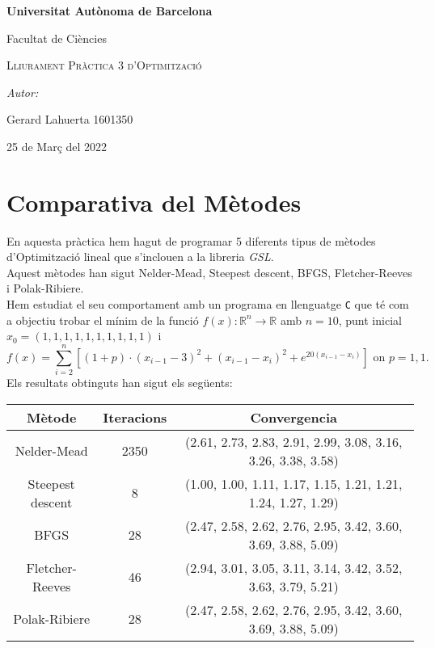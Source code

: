 \documentclass[a4paper, 11pt]{article}
\begin{document}
\begin{titlepage}
    \centering
    {\bfseries\LARGE Universitat Autònoma de Barcelona \par Facultat de Ciències\par}
    \vspace{2cm}
    \vspace{1cm}
    {\scshape\Huge Lliurament Pràctica 3 d'Optimització \par} 
    \vspace{1cm}
    {\Large \itshape Autor: \par}
    {\large Gerard Lahuerta 1601350\par}
    \vspace{1cm}
    {\Large 25 de Març del 2022\par}
\end{titlepage}

\justifying
\newpage
\section{Comparativa del Mètodes}
En aquesta pràctica hem hagut de programar 5 diferents tipus de mètodes d'Optimització lineal que s'inclouen a la libreria \textit{GSL}. \\
Aquest mètodes han sigut Nelder-Mead, Steepest descent, BFGS, Fletcher-Reeves i Polak-Ribiere.\\
Hem estudiat el seu comportament amb un programa en llenguatge \texttt{C} que té com a objectiu trobar el mínim de la funció $f(x): \mathbb{R}^n \longrightarrow \mathbb{R}$ amb $n=10$, punt inicial $x_0=(1,1,1,1,1,1,1,1,1,1)$ i
\begin{equation*}
    f(x) = \sum_{i=2}^{n}\left[(1+p)\cdot (x_{i-1}-3)^2 + (x_{i-1}-x_i)^2 + e^{20(x_{i-1}-x_i)}\right] \text{  on $p=1,1$.}
\end{equation*}
Els resultats obtinguts han sigut els següents:
\begin{center}
  \begin{tabular}{ c | c | c }
    \textbf{Mètode} & \textbf{Iteracions} & \textbf{Convergencia} \\ \hline
     Nelder-Mead & 2350 & (2.61, 2.73, 2.83, 2.91, 2.99, 3.08, 3.16, 3.26, 3.38, 3.58) \\ \hline
     Steepest descent &  8 & (1.00, 1.00, 1.11, 1.17, 1.15, 1.21, 1.21, 1.24, 1.27, 1.29) \\ \hline
     BFGS & 28 & (2.47, 2.58, 2.62, 2.76, 2.95, 3.42, 3.60, 3.69, 3.88, 5.09)  \\ \hline
     Fletcher-Reeves & 46 & (2.94, 3.01, 3.05, 3.11, 3.14, 3.42, 3.52, 3.63, 3.79, 5.21) \\ \hline
     Polak-Ribiere & 28 & (2.47, 2.58, 2.62, 2.76, 2.95, 3.42, 3.60, 3.69, 3.88, 5.09) \\ \hline
  \end{tabular}
\end{center}
\end{document}
